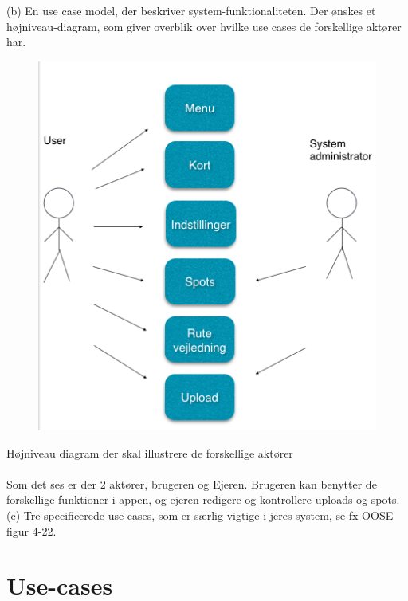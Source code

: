 \documentclass[12pt]{article}
\begin{document}
(b) En use case model, der beskriver system-funktionaliteten. Der ønskes et højniveau-diagram,
som giver overblik over hvilke use cases de forskellige aktører har.\\
\begin{figure}[htb]
\begin{center}
\includegraphics[scale = 0.65]{Umodel}
\end{center}
\end{figure}

Højniveau diagram der skal illustrere de forskellige aktører\\\\
Som det ses er der 2 aktører, brugeren og Ejeren. Brugeren kan benytter de forskellige funktioner i appen, og ejeren redigere og kontrollere uploads og spots. 
\pagebreak\\
(c) Tre specificerede use cases, som er særlig vigtige i jeres system, se fx OOSE figur 4-22.\\
\setlength\parindent{0pt}
\section*{Use-cases}
\end{document}

